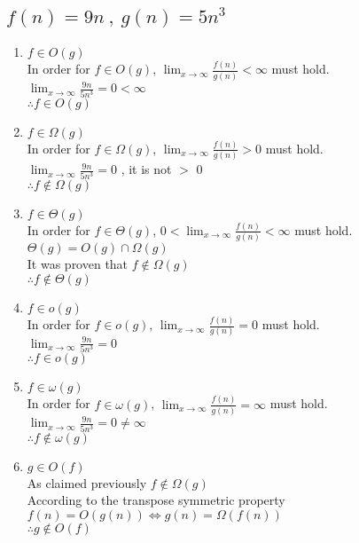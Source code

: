 \documentclass[11pt]{article}
\begin{document}
	\subsection{$f(n)=9n \ , \ g(n) = 5n^3$}
		\begin{enumerate}
			\item $f \in O(g)$ \\
				In order for $f \in O(g)$, $\lim_{x \to \infty} \frac{f(n)}{g(n)} < \infty$	must hold. \\
				$\lim_{x \to \infty} \frac{9n}{5n^3} = 0 < \infty$ \\
				$\therefore f \in O(g)$
				
			\item $f \in \Omega(g)$\\
				In order for $f \in \Omega(g)$, $\lim_{x \to \infty} \frac{f(n)}{g(n)} > 0$	must hold. \\
				$\lim_{x \to \infty} \frac{9n}{5n^3} = 0 $ , it is not $>$ 0 \\
				$\therefore f \notin \Omega(g)$
				
			\item $f \in \Theta(g)$ \\
				In order for $f \in \Theta(g)$, $0 < \lim_{x \to \infty} \frac{f(n)}{g(n)} < \infty$	must hold. \\
				$\Theta(g) = O(g) \cap \Omega(g)$ \\
				It was proven that $f \notin \Omega(g)$ \\
				$\therefore f \notin \Theta(g)$
			
			\item $f \in o(g)$ \\
				In order for $f \in o(g)$, $\lim_{x \to \infty} \frac{f(n)}{g(n)} = 0$	must hold. \\
				$\lim_{x \to \infty} \frac{9n}{5n^3} = 0 $\\
				$\therefore f \in o(g)$
			
			\item $f \in \omega(g)$ \\
				In order for $f \in \omega(g)$, $\lim_{x \to \infty} \frac{f(n)}{g(n)} = \infty$	must hold. \\
				$\lim_{x \to \infty} \frac{9n}{5n^3} = 0 \neq \infty$ \\
				$\therefore f \notin \omega(g)$
			
			
			\item $g \in O(f)$ \\
				As claimed previously $ f \notin \Omega(g)$ \\ 
				According to the transpose symmetric property $f(n) = O(g(n)) \Leftrightarrow g(n) = \Omega (f(n)) $ \\
				$\therefore g \notin O(f)$
				

\end{enumerate}
\end{document}
